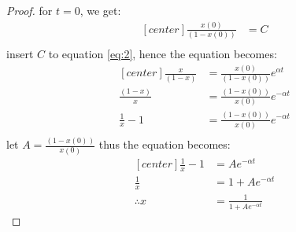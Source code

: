 \documentclass[a4paper,9pt]{article}
\begin{document}
\begin{proof}
	for $t=0$, we get:
	\begin{equation*}
	\begin{aligned}[center]
	\frac{x(0)}{(1-x(0))} &= C\\
	\end{aligned}
	\end{equation*}
	insert $C$ to equation \eqref{eq:2}, hence the equation becomes:
	\begin{equation*}\label{eq:3}
	\begin{aligned}[center]
	\frac{x}{(1-x)} &= \frac{x(0)}{(1-x(0))}e^{\alpha t}\\
	\frac{(1-x)}{x} &= \frac{(1-x(0))}{x(0)}e^{-\alpha t}\\
	\frac{1}{x} - 1 &= \frac{(1-x(0))}{x(0)}e^{-\alpha t}\\
	\end{aligned}
	\end{equation*}
	let $A=\frac{(1-x(0))}{x(0)}$ thus the equation becomes:
	\begin{equation*}
	\begin{aligned}[center]
	\frac{1}{x} - 1 &= Ae^{-\alpha t}\\
	\frac{1}{x} &= 1 + Ae^{-\alpha t}\\
	\therefore x &= \frac{1}{1 + Ae^{-\alpha t}}
	\end{aligned}
	\end{equation*}
\end{proof}
\end{document}

